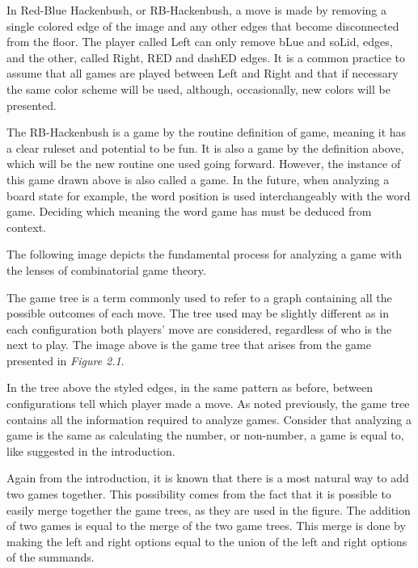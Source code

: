 In Red-Blue Hackenbush, or RB-Hackenbush, a move is made by removing a single colored edge of the image and any other edges that become disconnected from the floor. The player called Left can only remove bLue and soLid, edges, and the other, called Right, RED and dashED edges. It is a common practice to assume that all games are played between Left and Right and that if necessary the same color scheme will be used, although, occasionally, new colors will be presented.

The RB-Hackenbush is a game by the routine definition of game, meaning it has a clear ruleset and potential to be fun. It is also a game by the definition above, which will be the new routine one used going forward. However, the instance of this game drawn above is also called a game. In the future, when analyzing a board state for example, the word position is used interchangeably with the word game. Deciding which meaning the word game has must be deduced from context.

The following image depicts the fundamental process for analyzing a game with the lenses of combinatorial game theory.



The game tree is a term commonly used to refer to a graph containing all the possible outcomes of each move. The tree used may be slightly different as in each configuration both players' move are considered, regardless of who is the next to play. The image above is the game tree that arises from the game presented in \textit{Figure 2.1}.

In the tree above the styled edges, in the same pattern as before, between configurations tell which player made a move. As noted previously, the game tree contains all the information required to analyze games. Consider that analyzing a game is the same as calculating the number, or non-number, a game is equal to, like suggested in the introduction.

Again from the introduction, it is known that there is a most natural way to add two games together. This possibility comes from the fact that it is possible to easily merge together the game trees, as they are used in the figure. The addition of two games is equal to the merge of the two game trees. This merge is done by making the left and right options equal to the union of the left and right options of the summands.

